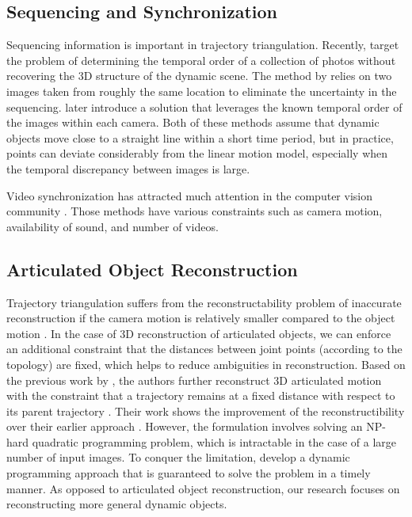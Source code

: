 \subsection{Sequencing and Synchronization}
Sequencing information is important in trajectory triangulation. Recently,
\citet{Basha_ECCV2012, Basha_ICCV2013} target the problem of determining the temporal order of a collection of photos without recovering the 3D structure of the dynamic scene. The method by \citet{Basha_ECCV2012} relies on two images taken from roughly the same location to eliminate the uncertainty in the sequencing. \citet{Basha_ICCV2013} later introduce a solution that leverages the known temporal order of the images within each camera. Both of these methods assume that dynamic objects move close to a straight line within a short time period, but in practice, points can deviate considerably from the linear motion model, especially when the temporal discrepancy between images is large. 

Video synchronization has attracted much attention in the computer vision community \cite{Tuytelaars_CVPR,shrestha2010synchronization,rao2003view}. Those methods have various constraints such as camera motion, availability of sound, and number of videos. 

\subsection{Articulated Object Reconstruction}
Trajectory triangulation suffers from the reconstructability problem of inaccurate reconstruction if the camera motion is relatively smaller compared to the object motion \cite{park20153d}. 
In the case of 3D reconstruction of articulated objects, we can enforce an additional constraint that the distances between joint points (according to the topology) are fixed, which helps to reduce ambiguities in reconstruction. 
Based on the previous work by \citet{Park_ECCV2010}, the authors further reconstruct 3D articulated motion with the constraint that a trajectory remains at a fixed distance with respect to its parent trajectory \cite{Park_ICCV2011}. Their work shows the improvement of the reconstructibility over their earlier approach \cite{Park_ECCV2010}.
However, the formulation involves solving an NP-hard quadratic programming problem, which is intractable in the case of a large number of input images. 
To conquer the limitation, \citet{Valmadre_ECCV2012} develop a dynamic programming approach that is guaranteed to solve the problem in a timely manner. 
As opposed to articulated object reconstruction, our research focuses on reconstructing more general dynamic objects. 

